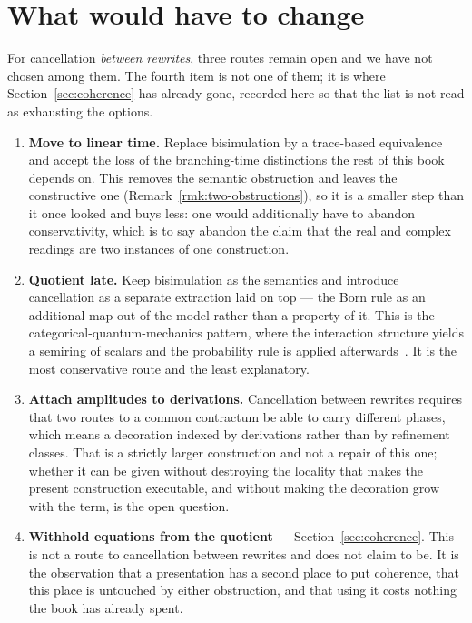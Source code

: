 \section{What would have to change}
\label{sec:whatwouldchange}

For cancellation \emph{between rewrites}, three routes remain open and we
have not chosen among them.  The fourth item is not one of them; it is
where Section~\ref{sec:coherence} has already gone, recorded here so that
the list is not read as exhausting the options.

\begin{enumerate}[itemsep=5pt]
  \item \textbf{Move to linear time.}  Replace bisimulation by a
        trace-based equivalence and accept the loss of the branching-time
        distinctions the rest of this book depends on.  This removes the
        semantic obstruction and leaves the constructive one
        (Remark~\ref{rmk:two-obstructions}), so it is a smaller step than
        it once looked and buys less: one would additionally have to
        abandon conservativity, which is to say abandon the claim that the
        real and complex readings are two instances of one construction.

  \item \textbf{Quotient late.}  Keep bisimulation as the semantics and
        introduce cancellation as a separate extraction laid on top ---
        the Born rule as an additional map out of the model rather than a
        property of it.  This is the categorical-quantum-mechanics
        pattern, where the interaction structure yields a semiring of
        scalars and the probability rule is applied
        afterwards~\cite{abramsky}.  It is the most conservative route and
        the least explanatory.

  \item \textbf{Attach amplitudes to derivations.}  Cancellation between
        rewrites requires that two routes to a common contractum be able
        to carry different phases, which means a decoration indexed by
        derivations rather than by refinement classes.  That is a strictly
        larger construction and not a repair of this one; whether it can
        be given without destroying the locality that makes the present
        construction executable, and without making the decoration grow
        with the term, is the open question.

  \item \textbf{Withhold equations from the quotient} ---
        Section~\ref{sec:coherence}.  This is not a route to cancellation
        between rewrites and does not claim to be.  It is the observation
        that a presentation has a second place to put coherence, that this
        place is untouched by either obstruction, and that using it costs
        nothing the book has already spent.
\end{enumerate}

